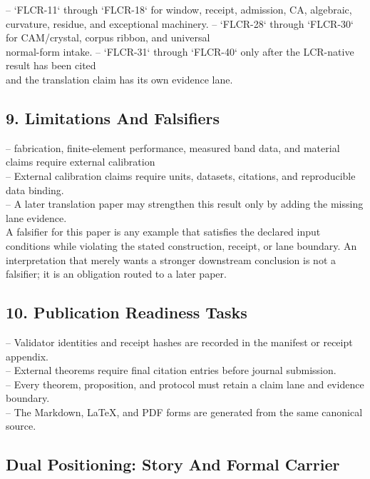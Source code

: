 \documentclass[11pt]{article}
\begin{document}
\noindent{}-- `FLCR-11` through `FLCR-18` for window, receipt, admission, CA, algebraic,\\
  curvature, residue, and exceptional machinery.
\noindent{}-- `FLCR-28` through `FLCR-30` for CAM/crystal, corpus ribbon, and universal\\
  normal-form intake.
\noindent{}-- `FLCR-31` through `FLCR-40` only after the LCR-native result has been cited\\
  and the translation claim has its own evidence lane.

\subsection*{9. Limitations And Falsifiers}

\noindent{}-- fabrication, finite-element performance, measured band data, and material claims require external calibration\\
\noindent{}-- External calibration claims require units, datasets, citations, and reproducible data binding.\\
\noindent{}-- A later translation paper may strengthen this result only by adding the missing lane evidence.\\

A falsifier for this paper is any example that satisfies the declared input
conditions while violating the stated construction, receipt, or lane boundary.
An interpretation that merely wants a stronger downstream conclusion is not a
falsifier; it is an obligation routed to a later paper.

\subsection*{10. Publication Readiness Tasks}

\noindent{}-- Validator identities and receipt hashes are recorded in the manifest or receipt appendix.\\
\noindent{}-- External theorems require final citation entries before journal submission.\\
\noindent{}-- Every theorem, proposition, and protocol must retain a claim lane and evidence boundary.\\
\noindent{}-- The Markdown, LaTeX, and PDF forms are generated from the same canonical source.\\

\subsection*{Dual Positioning: Story And Formal Carrier}
\end{document}
